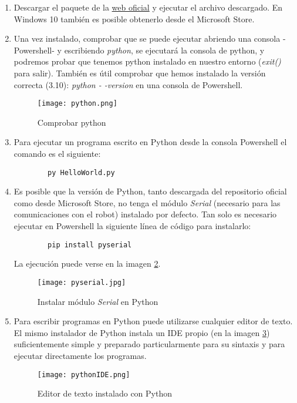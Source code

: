 \begin{enumerate}\label{list:instalacionPython}
	\item Descargar el paquete de la \href{https://www.python.org/downloads/}{web oficial} y ejecutar el archivo descargado. En Windows 10 también es posible obtenerlo desde el Microsoft Store.
	\item Una vez instalado, comprobar que se puede ejecutar abriendo una consola -Powershell- y escribiendo \textit{python}, se ejecutará la consola de python, y podremos probar que tenemos python instalado en nuestro entorno (\textit{exit()} para salir). También es útil comprobar que hemos instalado la versión correcta (3.10): \textit{python - -version} en una consola de Powershell.
	\begin{figure}[h]
		\texttt{[image: python.png]}
		\centering		
		\caption{Comprobar python}
		\label{img:python}
	\end{figure}
	\item Para ejecutar un programa escrito en Python desde la consola  Powershell el comando es el siguiente: 
	\begin{verbatim}
		py HelloWorld.py
	\end{verbatim}
	\item Es posible que la versión de Python, tanto descargada del repositorio oficial como desde Microsoft Store, no tenga el módulo \textit{Serial} (necesario para las comunicaciones con el robot) instalado por defecto. Tan solo es necesario ejecutar en Powershell la siguiente línea de código para instalarlo:
	\begin{verbatim}
		pip install pyserial
	\end{verbatim}
	La ejecución puede verse en la imagen \ref{img:pyserial}.
	\begin{figure}[h]
		\texttt{[image: pyserial.jpg]}
		\centering		
		\caption{Instalar módulo \textit{Serial} en Python}
		\label{img:pyserial}
	\end{figure}
	\item Para escribir programas en Python puede utilizarse cualquier editor de texto. El mismo instalador de Python instala un IDE propio (en la imagen \ref{img:pythonIDE}) suficientemente simple y preparado particularmente para su sintaxis y para ejecutar directamente los programas.
	\begin{figure}[t]
		\texttt{[image: pythonIDE.png]}
		\centering		
		\caption{Editor de texto instalado con Python}
		\label{img:pythonIDE}
	\end{figure}
\end{enumerate}
\newpage

